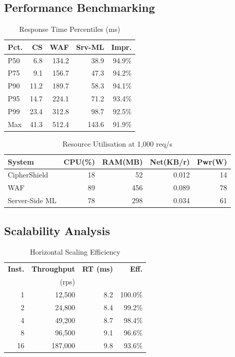 \documentclass[10pt,twocolumn]{article}
\begin{document}
\subsection{Performance Benchmarking}

\begin{table}[H]
\centering
\caption{Response Time Percentiles (ms)}
\label{tab:perf}
\small
\setlength{\tabcolsep}{4pt}
\begin{tabular}{@{}lrrrr@{}}
\toprule
\textbf{Pct.} & \textbf{CS} & \textbf{WAF} & \textbf{Srv-ML} & \textbf{Impr.} \\
\midrule
P50  &  6.8 & 134.2 &  38.9 & 94.9\% \\
P75  &  9.1 & 156.7 &  47.3 & 94.2\% \\
P90  & 11.2 & 189.7 &  58.3 & 94.1\% \\
P95  & 14.7 & 224.1 &  71.2 & 93.4\% \\
P99  & 23.4 & 312.8 &  98.7 & 92.5\% \\
Max  & 41.3 & 512.4 & 143.6 & 91.9\% \\
\bottomrule
\end{tabular}
\end{table}

\begin{table}[H]
\centering
\caption{Resource Utilisation at 1{,}000 req/s}
\label{tab:resource}
\small
\setlength{\tabcolsep}{3pt}
\begin{tabular}{@{}lrrrr@{}}
\toprule
\textbf{System} & \textbf{CPU(\%)} & \textbf{RAM(MB)} & \textbf{Net(KB/r)} & \textbf{Pwr(W)} \\
\midrule
CipherShield   & 18 &  52 & 0.012 & 14 \\
WAF            & 89 & 456 & 0.089 & 78 \\
Server-Side ML & 78 & 298 & 0.034 & 61 \\
\bottomrule
\end{tabular}
\end{table}

\subsection{Scalability Analysis}

\begin{table}[H]
\centering
\caption{Horizontal Scaling Efficiency}
\label{tab:scale}
\small
\setlength{\tabcolsep}{5pt}
\begin{tabular}{@{}rrrr@{}}
\toprule
\textbf{Inst.} & \textbf{Throughput} & \textbf{RT (ms)} & \textbf{Eff.} \\
               & (rps)               &                  &               \\
\midrule
 1 &  12,500  & 8.2 & 100.0\% \\
 2 &  24,800  & 8.4 &  99.2\% \\
 4 &  49,200  & 8.7 &  98.4\% \\
 8 &  96,500  & 9.1 &  96.6\% \\
16 & 187,000  & 9.8 &  93.6\% \\
\bottomrule
\end{tabular}
\end{table}
\end{document}
